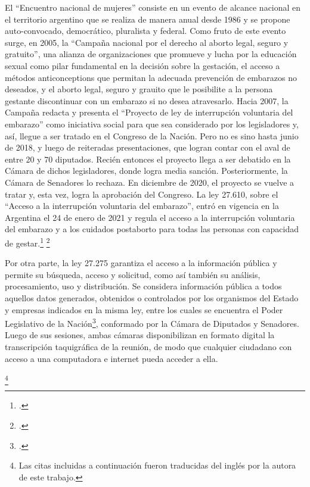 El ``Encuentro nacional de mujeres'' consiste en un evento de alcance nacional
en el territorio argentino que se realiza de manera anual desde 1986 y se propone
auto-convocado, democr\'atico, pluralista y federal.
Como fruto de este evento surge, en 2005, la ``Campaña nacional por el derecho al
aborto legal, seguro y gratuito'', una alianza de organizaciones que promueve y
lucha por la educaci\'on sexual como pilar fundamental en la decisi\'on sobre la gestaci\'on,
el acceso a m\'etodos anticonceptions que permitan la adecuada prevenci\'on de embarazos
no deseados, y el aborto legal, seguro y grauito que le posibilite a la persona gestante
discontinuar con un embarazo si no desea atravesarlo.
Hacia 2007, la Campaña redacta y presenta el ``Proyecto de ley de interrupci\'on
voluntaria del embarazo'' como iniciativa social para que sea considerado por los
legisladores y, as\'i, llegue a ser tratado en el Congreso de la Naci\'on.
Pero no es sino hasta junio de 2018, y luego de reiteradas presentaciones, que logran
contar con el aval de entre 20 y 70 diputados. Reci\'en entonces el proyecto llega a
ser debatido en la C\'amara de dichos legisladores, donde logra media sanci\'on.
Posteriormente, la C\'amara de Senadores lo rechaza.
En diciembre de 2020, el proyecto se vuelve a tratar y, esta vez, logra la aprobaci\'on
del Congreso.
La ley 27.610, sobre el ``Acceso a la interrupci\'on voluntaria del embarazo'', entr\'o
en vigencia en la Argentina el 24 de enero de 2021 y regula el acceso a la
interrupci\'on voluntaria del embarazo y a los cuidados postaborto para todas
las personas con capacidad de gestar.\footnote{\citeauthor{campana@lalucha}.}
\footnote{\citeauthor{huesped@historia}.}
\par
Por otra parte, la ley 27.275 garantiza el acceso a la informaci\'on p\'ublica y permite su b\'usqueda,
acceso y solicitud, como as\'i tambi\'en su an\'alisis, procesamiento, uso y distribuci\'on.
Se considera informaci\'on p\'ublica a todos aquellos datos generados, obtenidos o
controlados por los organismos del Estado y empresas indicados en la misma ley, entre
los cuales se encuentra el Poder Legislativo de la
Naci\'on\footnote{\citeauthor{minjusticia@accesoinfo}.}, conformado por la C\'amara
de Diputados y Senadores.
Luego de sus sesiones, ambas c\'amaras disponibilizan en formato digital la
transcripci\'on taquigr\'afica de la reuni\'on, de modo que cualquier ciudadano con
acceso a una computadora e internet pueda acceder a ella.
\par
\cite{jurafsky2000speech}\footnote{
Las citas incluidas a continuaci\'on fueron traducidas del ingl\'es por
la autora de este trabajo.}
